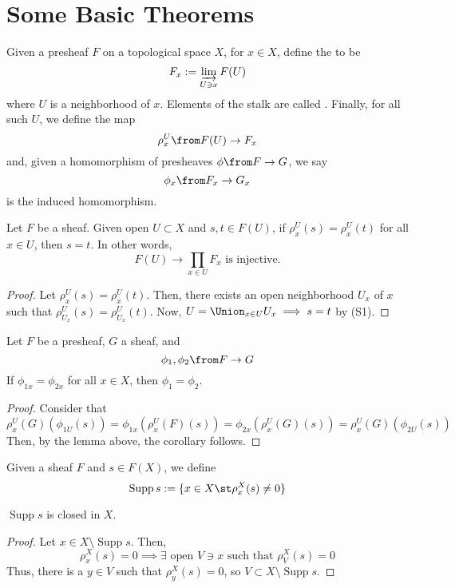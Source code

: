 \documentclass[11pt,leqno,oneside]{amsbook}
\renewcommand{\F}{F}
\newcommand{\G}{G}
\DeclareMathOperator{\Supp}{Supp} %
\numberwithin{thm}{section}
\begin{document}
\section{Some Basic Theorems}
\begin{defn}
  Given a presheaf \(\F\) on a topological space \(X\), for \(x \in
  X\), define the  to be \[
    \F_x := \varinjlim_{U \ni x} \F(U)
  \]
  where \(U\) is a neighborhood of \(x\). Elements of the stalk are
  called . Finally, for all such \(U\), we define the map \[
    \rho_x^U \from \F(U) \to \F_x
  \]
  and, given a homomorphism of presheaves \(\phi \from \F \to \G\), we
  say \[
    \phi_x \from \F_x \to \G_x
  \]
  is the induced homomorphism.
\end{defn}
\begin{lem}
  Let \(\F\) be a sheaf. Given open \(U \subset X\) and \(s,t \in
  \F(U)\), if \(\rho_x^U(s) = \rho_x^U(t)\) for all \(x \in U\), then
  \(s=t\). In other words, \[
    \F(U) \to \prod_{x \in U} F_x \text{ is injective.}
  \]
\end{lem}
\begin{proof}
  Let \(\rho_x^U(s) = \rho_x^U(t)\). Then, there exists an open neighborhood
  \(U_x\) of \(x\) such that \(\rho_{U_x}^U(s) =
  \rho_{U_x}^U(t)\). Now, \(U = \Union_{x \in U} U_x \implies s=t\) by
  (S1). 
\end{proof}
\begin{cor}
  Let \(\F\) be a presheaf, \(\G\) a sheaf, and \[
    \phi_1, \phi_2 \from \F \to \G
  \]
  If \(\phi_{1x} = \phi_{2x}\) for all \(x \in X\), then \(\phi_1 =
  \phi_2\). 
\end{cor}
\begin{proof}
  Consider that \[
    \rho^U_x(\G)(\phi_{1U}(s)) = \phi_{1x}(\rho_x^U(\F)(s)) =
    \phi_{2x}(\rho^U_x(\G)(s)) = \rho^U_x(\G)(\phi_{2U}(s))
  \]
  Then, by the lemma above, the corollary follows.
\end{proof}
\begin{defn}
  Given a sheaf \(\F\) and \(s \in \F(X)\), we define \[
    \Supp s := \{x \in X \st \rho^X_x(s) \neq 0\}
  \]
\end{defn}
\begin{prop}
  \(\Supp s\) is closed in \(X\).
\end{prop}
\begin{proof}
  Let \(x \in X \setminus \Supp s\). Then, \[
    \rho^X_x(s) = 0 \implies \exists \text{ open } V \ni x \text{ such that }
    \rho^X_V(s) = 0
  \]
  Thus, there is a \(y \in V\) such that \(\rho^X_y(s) = 0\), so \(V
  \subset X \setminus \Supp s\).
\end{proof}
\end{document}
